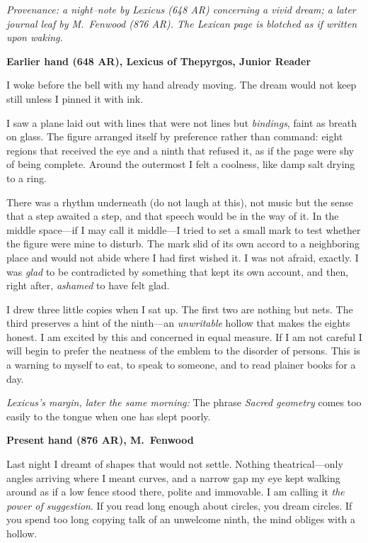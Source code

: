 \documentclass[11pt]{article}
\numberwithin{equation}{section} %
\theoremstyle{plain} %
\theoremstyle{definition} %
\theoremstyle{remark} %
\begin{document}
\noindent\textit{Provenance: a night--note by Lexicus (648 AR) concerning a vivid dream; a later journal leaf by M.\ Fenwood (876 AR). The Lexican page is blotched as if written upon waking.}

\medskip
\noindent\textbf{Earlier hand (648 AR), Lexicus of Thepyrgos, Junior Reader}

I woke before the bell with my hand already moving. The dream would not keep still unless I pinned it with ink.

I saw a plane laid out with lines that were not lines but \emph{bindings}, faint as breath on glass. The figure arranged itself by preference rather than command: eight regions that received the eye and a ninth that refused it, as if the page were shy of being complete. Around the outermost I felt a coolness, like damp salt drying to a ring.

There was a rhythm underneath (do not laugh at this), not music but the sense that a step awaited a step, and that speech would be in the way of it. In the middle space---if I may call it middle---I tried to set a small mark to test whether the figure were mine to disturb. The mark slid of its own accord to a neighboring place and would not abide where I had first wished it. I was not afraid, exactly. I was \emph{glad} to be contradicted by something that kept its own account, and then, right after, \emph{ashamed} to have felt glad.

I drew three little copies when I sat up. The first two are nothing but nets. The third preserves a hint of the ninth---an \emph{unwritable} hollow that makes the eights honest. I am excited by this and concerned in equal measure. If I am not careful I will begin to prefer the neatness of the emblem to the disorder of persons. This is a warning to myself to eat, to speak to someone, and to read plainer books for a day.

\medskip
\noindent\textit{Lexicus's margin, later the same morning:} The phrase \emph{Sacred geometry} comes too easily to the tongue when one has slept poorly.

\medskip
\noindent\textbf{Present hand (876 AR), M.\ Fenwood}

Last night I dreamt of shapes that would not settle. Nothing theatrical---only angles arriving where I meant curves, and a narrow gap my eye kept walking around as if a low fence stood there, polite and immovable. I am calling it \emph{the power of suggestion}. If you read long enough about circles, you dream circles. If you spend too long copying talk of an unwelcome ninth, the mind obliges with a hollow.
\end{document}
